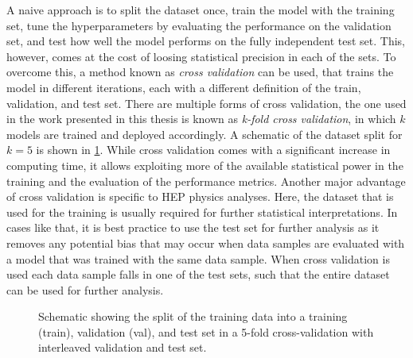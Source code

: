 A naive approach is to split the dataset once, train the model with the training set, tune the hyperparameters by evaluating the performance on the validation set, and test how well the model performs on the fully independent test set. 
This, however, comes at the cost of loosing statistical precision in each of the sets. 
To overcome this, a method known as \emph{cross validation} can be used, that trains the model in different iterations, each with a different definition of the train, validation, and test set.
There are multiple forms of cross validation, the one used in the work presented in this thesis is known as \emph{k-fold cross validation}, in which $k$ models are trained and deployed accordingly. A schematic of the dataset split for $k=5$ is shown in \cref{fig:k-fold-method}. 
While cross validation comes with a significant increase in computing time, it allows exploiting more of the available statistical power in the training and the evaluation of the performance metrics.
Another major advantage of cross validation is specific to HEP physics analyses. 
Here, the dataset that is used for the training is usually required for further statistical interpretations. In cases like that, it is best practice to use the test set for further analysis as it removes any potential bias that may occur when data samples are evaluated with a model that was trained with the same data sample.
When cross validation is used each data sample falls in one of the test sets, such that the entire dataset can be used for further analysis.

\begin{figure}[t]
    \caption{Schematic showing the split of the training data into a training (train), validation (val), and test set in a 5-fold cross-validation with interleaved validation and test set.}
    \label{fig:k-fold-method}
\end{figure}
